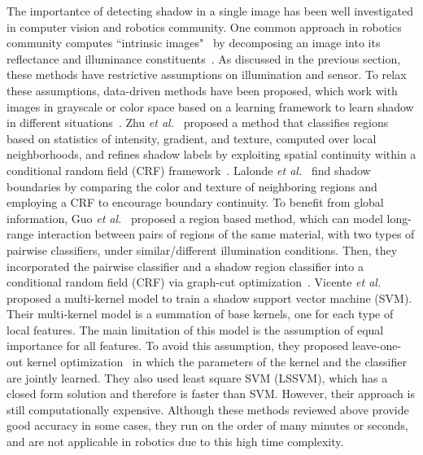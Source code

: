 \documentclass[letterpaper, 10 pt, conference]{ieeeconf}
\begin{document}
The importantce of detecting shadow in a single image has been well investigated in computer vision and robotics community. One common approach in robotics community computes ``intrinsic images"~\cite{tanenbaum} by decomposing an image into its reflectance and illuminance constituents~\cite{Corke,Shakeri}. As discussed in the previous section, these methods have restrictive assumptions on illumination and sensor. To relax these assumptions, data-driven methods have been proposed, which work with images in grayscale or color space based on a learning framework to learn shadow in different situations~\cite{Lalonde,Gue,Vicente,Zhu}. Zhu {\it{et al.}}~\cite{Zhu} proposed a method that classifies regions based on statistics of intensity, gradient, and texture, computed over local neighborhoods, and refines shadow labels by exploiting spatial continuity within a conditional random field (CRF) framework~\cite{CRF}. Lalonde {\it{et al.}}~\cite{Lalonde} find shadow boundaries by comparing the color and texture of neighboring regions and employing a CRF to encourage boundary continuity. To benefit from global information, Guo {\it{et al.}}~\cite{Gue} proposed a region based method, which can model long-range interaction between pairs of regions of the same material, with two types of pairwise classifiers, under similar/different illumination conditions. Then, they incorporated the pairwise classifier and a shadow
region classifier into a conditional random field (CRF) via graph-cut optimization~\cite{Graph_cut}. Vicente {\it{et al.}}~\cite{Vicente} proposed a multi-kernel model to train a shadow support vector machine (SVM). Their multi-kernel model is a summation of base kernels, one for each type of local features. The main limitation of this model is the assumption of equal importance for all features. To avoid this assumption, they proposed leave-one-out kernel optimization~\cite{Vincente_rev} in which the parameters of the kernel and the classifier are jointly learned. They also used least square SVM (LSSVM), which has a closed form solution and therefore is faster than SVM. However, their approach is still computationally expensive.
Although these methods reviewed above provide good accuracy in some cases, they run on the order of many minutes or seconds, and are not applicable in robotics due to this high time complexity.
\end{document}
